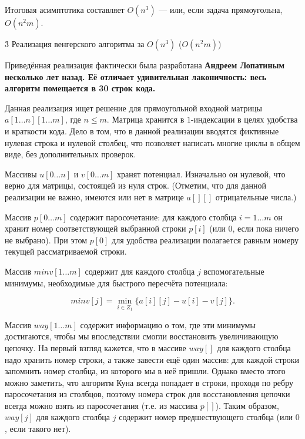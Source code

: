 Итоговая асимптотика составляет $O(n^3)$ --- или, если задача прямоугольна, $O(n^2 m)$.


\h3{ Реализация венгерского алгоритма за $O(n^3)$ ($O(n^2 m)$) }

Приведённая реализация фактически была разработана \bf{Андреем Лопатиным} несколько лет назад. Её отличает удивительная лаконичность: весь алгоритм помещается в \bf{30 строк кода}.

Данная реализация ищет решение для прямоугольной входной матрицы $a[1 \ldots n][1 \ldots m]$, где $n \le m$. Матрица хранится в $1$-индексации в целях удобства и краткости кода. Дело в том, что в данной реализации вводятся фиктивные нулевая строка и нулевой столбец, что позволяет написать многие циклы в общем виде, без дополнительных проверок.

Массивы $u[0 \ldots n]$ и $v[0 \ldots m]$ хранят потенциал. Изначально он нулевой, что верно для матрицы, состоящей из нуля строк. (Отметим, что для данной реализации не важно, имеются или нет в матрице $a[][]$ отрицательные числа.)

Массив $p[0 \ldots m] $ содержит паросочетание: для каждого столбца $i = 1 \ldots m$ он хранит номер соответствующей выбранной строки $p[i]$ (или $0$, если пока ничего не выбрано). При этом $p[0]$ для удобства реализации полагается равным номеру текущей рассматриваемой строки.

Массив $minv[1 \ldots m]$ содержит для каждого столбца $j$ вспомогательные минимумы, необходимые для быстрого пересчёта потенциала:

$$ minv[j] = \min_{i \in Z_1} \{ a[i][j] - u[i] - v[j] \}. $$

Массив $way[1 \ldots m]$ содержит информацию о том, где эти минимумы достигаются, чтобы мы впоследствии смогли восстановить увеличивающую цепочку. На первый взгляд кажется, что в массиве $way[]$ для каждого столбца надо хранить номер строки, а также завести ещё один массив: для каждой строки запомнить номер столбца, из которого мы в неё пришли. Однако вместо этого можно заметить, что алгоритм Куна всегда попадает в строки, проходя по ребру паросочетания из столбцов, поэтому номера строк для восстановления цепочки всегда можно взять из паросочетания (т.е. из массива $p[]$). Таким образом, $way[j]$ для каждого столбца $j$ содержит номер предшествующего столбца (или $0$, если такого нет).

